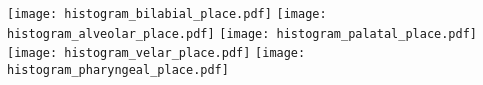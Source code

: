 \documentclass[varwidth=7in]{standalone}
\begin{document}
\raggedright

\texttt{[image: histogram\_bilabial\_place.pdf]}%
\texttt{[image: histogram\_alveolar\_place.pdf]}%
\texttt{[image: histogram\_palatal\_place.pdf]}%
\texttt{[image: histogram\_velar\_place.pdf]}%
\texttt{[image: histogram\_pharyngeal\_place.pdf]}
\end{document}
